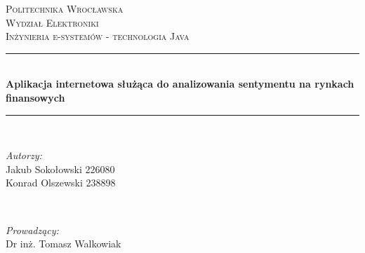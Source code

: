 \begin{titlepage}

\newcommand{\HRule}{\rule{\linewidth}{0.5mm}} %

\center %
\vspace*{\fill}

\textsc{\LARGE Politechnika Wrocławska}\\[0.5cm] %
\textsc{\Large Wydział Elektroniki}\\[1.5cm] %
\textsc{\large Inżynieria e-systemów - technologia Java}\\[0.5cm] %


\HRule \\[0.4cm]
{ \huge \bfseries Aplikacja internetowa służąca do analizowania sentymentu na rynkach finansowych}\\[0.4cm] %
\HRule \\[1.5cm]

\begin{minipage}[t]{0.4\textwidth}
\begin{flushleft} \large
\emph{Autorzy:}\\
Jakub Sokołowski 226080\\
Konrad Olszewski 238898\\
\end{flushleft}
\end{minipage}
~
\begin{minipage}[t]{0.5\textwidth}
\begin{flushright} \large
\emph{Prowadzący:} \\
Dr inż. Tomasz Walkowiak
\end{flushright}
\end{minipage}\\


\end{titlepage}
